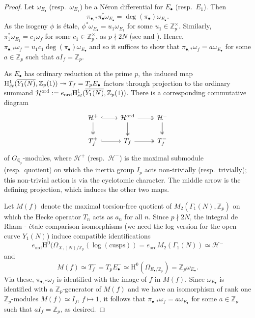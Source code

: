 \documentclass[a4paper,10pt]{amsart}
\numberwithin{equation}{section}
\numberwithin{equation}{section}
\theoremstyle{plain}
\theoremstyle{definition}
\theoremstyle{definition}
\theoremstyle{plain}
\theoremstyle{plain}
\theoremstyle{plain}
\theoremstyle{plain}
\DeclareMathOperator{\ord}{ord}
\newcommand{\Z}{\mathbb{Z}}
\newcommand{\Qp}{\mathbb{Q}_{p}}
\newcommand{\Zp}{\mathbb{Z}_{p}}
\newcommand{\et}{\rm \acute{e}t}
\newcommand{\rH}{\mathrm{H}}
\begin{document}
\begin{proof} 
Let $\omega_{E_\bullet}$ (resp.~$\omega_{E_1}$) be a N\'eron differential for $E_\bullet$ (resp.~$E_1$). Then 
\[
\pi_{\bullet,*}\pi_\bullet^*\omega_{E_\bullet} = \deg(\pi_\bullet)\omega_{E_\bullet}.
\]
As the isogeny $\phi$ is \'etale, $\phi^*\omega_{E_\bullet} = u_1 \omega_{E_1}$ for some $u_1\in \Z_p^\times$. Similarly,
$\pi_1^* \omega_{E_1} = c_1\omega_f$ for some $c_1\in \Z_p^\times$, as $p\nmid 2N$ (see \cite[Cor.\,4.1]{mazur} and \cite[Prop.\,~3.3]{greenvats}). Hence, $\pi_{\bullet,*}\omega_f = u_1c_1\deg(\pi_\bullet)\omega_{E_\bullet}$
and so it suffices to show that $\pi_{\bullet,*}\omega_f = a \omega_{E_\bullet}$ for some $a\in\Zp$ such that $a I_f = \Zp$.

As $E_\bullet$ has ordinary reduction at the prime $p$, the induced map $\rH^1_{\et}(\overline{Y_1(N)},\Zp(1))\twoheadrightarrow T_f = T_pE_\bullet$ factors through 
projection to the ordinary summand $\mathcal{H}^{\ord} :=e_{\ord} \rH^1_{\et}(\overline{Y_1(N)},\Zp(1))$. There is a corresponding commutative diagram
\[
\begin{tikzcd}
\mathcal{H}^+ \arrow[r,hook] \arrow[d,two heads] & \mathcal{H}^{\ord} \arrow[r,two heads] \arrow[d,two heads] & \mathcal{H}^- \arrow[d,two heads] \\
T_{f}^+ \arrow[r,hook] & T_{f} \arrow[r,two heads] & T_f^-
\end{tikzcd}
\]
of $G_{\Qp}$-modules,
where $\mathcal{H}^+$ (resp.~$\mathcal{H}^-$) is the maximal submodule (resp.~quotient) on which the inertia group $I_p$ acts non-trivially (resp.~trivially); this non-trivial
action is via the cyclotomic character. The middle arrow is the defining projection, which induces the other two maps. 

Let $M(f)$ denote the maximal torsion-free quotient of $M_2(\Gamma_1(N),\Z_p)$ on which the Hecke operator $T_n$ acts as $a_n$ for all $n$. 
Since $p\nmid 2N$, the integral de Rham - \'{e}tale comparison isomorphisms (we need the log version for the open curve $Y_1(N)$)
induce compatible identifications 
\[
e_{\ord}\rH^0(\Omega_{X_1(N)/\Zp}(\log(\mathrm{cusps})) = e_{\ord} M_2(\Gamma_1(N))\simeq \mathcal{H}^-
\]
and
\[ 
M(f) \simeq T_f^-= T_pE_\bullet^- \simeq\rH^0(\Omega_{E_\bullet/\Zp}) = \Zp \omega_{E_\bullet}. 
\]
Via these, $\pi_{\bullet,*}\omega_f$ is identified with the image of $f$ in
$M(f)$. Since $\omega_{E_\bullet}$ is identified with a $\Zp$-generator of $M(f)$ and we have an isomorphism of rank one $\Zp$-modules $M(f) \simeq I_f$, $f\mapsto 1$,
it follows that $\pi_{\bullet,*}\omega_f = a \omega_{E_\bullet}$ for some $a\in \Zp$ such that $aI_f = \Zp$, as desired.
\end{proof} 
\end{document}
